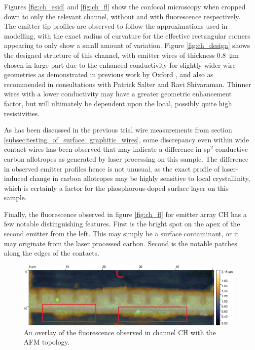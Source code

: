 \begin{refsection}
Figures \ref{fig:ch_esid} and \ref{fig:ch_fl} show the confocal microscopy when cropped down to only the relevant channel, without and with fluorescence respectively. The emitter tip profiles are observed to follow the approximations used in modelling, with the exact radius of curvature for the effective rectangular corners appearing to only show a small amount of variation. Figure \ref{fig:ch_design} shows the designed structure of this channel, with emitter wires of thickness 0.8~\si{\micro\metre} chosen in large part due to the enhanced conductivity for slightly wider wire geometries as demonstrated in previous work by Oxford \cite{sun2014}, and also as recommended in consultations with Patrick Salter and Ravi Shivaraman. Thinner wires with a lower conductivity may have a greater geometric enhancement factor, but will ultimately be dependent upon the local, possibly quite high resistivities. 

As has been discussed in the previous trial wire measurements from section \ref{subsec:testing_of_surface_graphitic_wires}, some discrepancy even within wide contact wires has been observed that may indicate a difference in sp$^{2}$ conductive carbon allotropes as generated by laser processing on this sample. The difference in observed emitter profiles hence is not unusual, as the exact profile of laser-induced change in carbon allotropes may be highly sensitive to local crystallinity, which is certainly a factor for the phosphorous-doped surface layer on this sample.

Finally, the fluorescence observed in figure \ref{fig:ch_fl} for emitter array CH has a few notable distinguishing features. First is the bright spot on the apex of the second emitter from the left. This may simply be a surface contaminant, or it may originate from the laser processed carbon. Second is the notable patches along the edges of the contacts. 

\begin{figure}[H]
    \centering
    \includegraphics[width=0.8\linewidth]{Chapter7/Figs/Raster/CH_cropped_overlay.jpg}
    \caption{An overlay of the fluorescence observed in channel CH with the AFM topology.}
    \label{fig:ch_overlay}
\end{figure}


\end{refsection}
